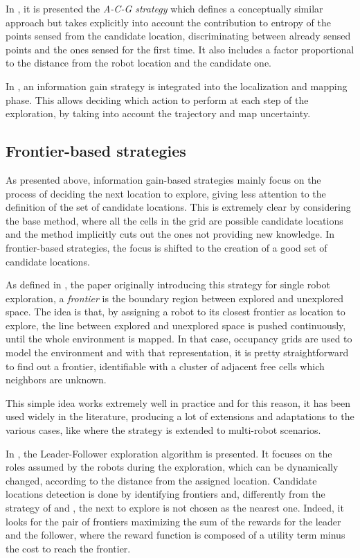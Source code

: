In \cite{Amigoni2004}, it is presented the \emph{A-C-G strategy }which defines
a conceptually similar approach but takes explicitly into account
the contribution to entropy of the points sensed from the candidate
location, discriminating between already sensed points and the ones
sensed for the first time. It also includes a factor proportional
to the distance from the robot location and the candidate one. 

In \cite{Stachniss2005}, an information gain strategy is integrated
into the localization and mapping phase. This allows deciding which
action to perform at each step of the exploration, by taking into
account the trajectory and map uncertainty. 

\subsection{Frontier-based strategies}

As presented above, information gain-based strategies mainly focus
on the process of deciding the next location to explore, giving less
attention to the definition of the set of candidate locations. This
is extremely clear by considering the base method, where all the cells
in the grid are possible candidate locations and the method implicitly
cuts out the ones not providing new knowledge. In frontier-based strategies,
the focus is shifted to the creation of a good set of candidate locations. 

As defined in \cite{Yamauchi}, the paper originally introducing this strategy
for single robot exploration, a \emph{frontier} is the boundary region
between explored and unexplored space. The idea is that, by assigning
a robot to its closest frontier as location to explore, the line between
explored and unexplored space is pushed continuously, until the whole
environment is mapped. In that case, occupancy grids are used to model
the environment and with that representation, it is pretty straightforward
to find out a frontier, identifiable with a cluster of adjacent free
cells which neighbors are unknown. 

This simple idea works extremely well in practice and for this reason,
it has been used widely in the literature, producing a lot of extensions
and adaptations to the various cases, like \cite{Yamauchi1998} where the strategy
is extended to multi-robot scenarios. 

In \cite{Wang2014}, the Leader-Follower
exploration algorithm is presented. It focuses on the roles assumed
by the robots during the exploration, which can be dynamically changed,
according to the distance from the assigned location. Candidate locations
detection is done by identifying frontiers and, differently from the
strategy of \cite{Yamauchi} and \cite{Yamauchi1998}, the next to explore is not
chosen as the nearest one. Indeed, it looks for the pair of frontiers
maximizing the sum of the rewards for the leader and the follower,
where the reward function is composed of a utility term minus the
cost to reach the frontier. 

